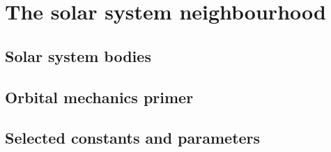 \documentclass[Orbiter User Manual.tex]{subfiles}
\begin{document}
\section{The solar system neighbourhood}

\subsection{Solar system bodies}

\subsection{Orbital mechanics primer}

\subsection{Selected constants and parameters}
\end{document}
